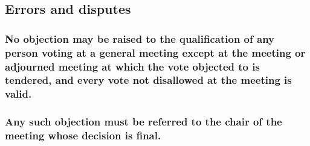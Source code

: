 \documentclass[12pt]{article}
\begin{document}
\subsection{Errors and disputes}
\subsubsection{No objection may be raised to the qualification of any person voting at a general meeting except at the meeting or adjourned meeting at which the vote objected to is tendered, and every vote not disallowed at the meeting is valid.}
\subsubsection{Any such objection must be referred to the chair of the meeting whose decision is final.}
\end{document}
